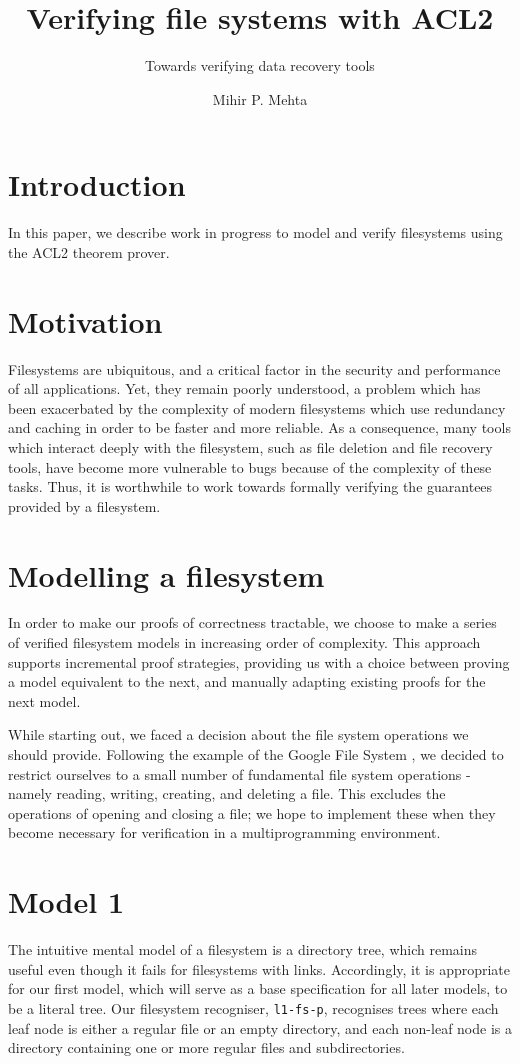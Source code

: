 \documentclass[format=sigconf,review=true]{acmart}
\title{Verifying file systems with ACL2}
\subtitle{Towards verifying data recovery tools}
\author{Mihir P. Mehta}
\affiliation{%
  \institution{University of Texas at Austin}
  \city{Austin}
  \state{TX}
  \country{USA}}
\begin{document}
\lstset{language=Lisp}

\maketitle

\section{Introduction}

In this paper, we describe work in progress to model and verify
filesystems using the ACL2 theorem prover.

\section{Motivation}
Filesystems are ubiquitous, and a critical factor in the security and
performance of all applications. Yet, they remain poorly understood,
a problem which has been exacerbated by the complexity of modern
filesystems which use redundancy and caching in order to be faster and
more reliable. As a consequence, many tools which interact deeply with
the filesystem, such as file deletion and file recovery tools, have
become more vulnerable to bugs because of the complexity of these
tasks. Thus, it is worthwhile to work towards formally verifying the
guarantees provided by a filesystem.

\section{Modelling a filesystem}

In order to make our proofs of correctness tractable, we choose to
make a series of verified filesystem models in increasing order of
complexity. This approach supports incremental proof strategies,
providing us with a choice between proving a model equivalent to the
next, and manually adapting existing proofs for the next model.

While starting out, we faced a decision about the file system
operations we should provide. Following the  example of the Google
File System \cite{Ghemawat:2003:GFS:945445.945450}, we decided to
restrict ourselves to a small number of fundamental file system
operations - namely reading, writing, creating, and deleting a
file. This excludes the operations of opening and closing a file; we
hope to implement these when they become necessary for verification in
a multiprogramming environment.

\section{Model 1}
The intuitive mental model of a filesystem is a directory tree, which
remains useful even though it fails for filesystems with
links. Accordingly, it is appropriate for our first model, which will
serve as a base specification for all later models, to be a literal
tree. Our filesystem recogniser, \texttt{l1-fs-p}, recognises trees
where each leaf node is either a regular file or an empty directory,
and each non-leaf node is a directory containing one or more regular
files and subdirectories.
\end{document}
